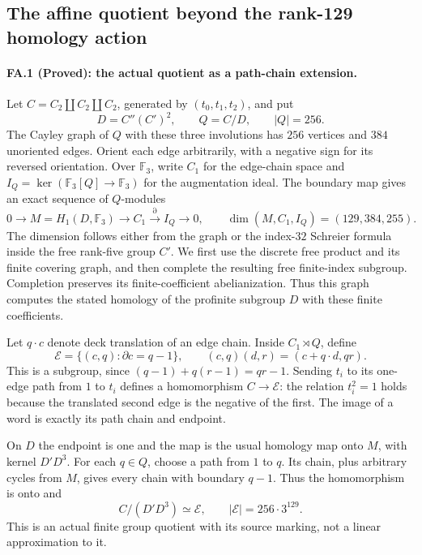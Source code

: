 \subsection*{The affine quotient beyond the rank-129 homology action}

\paragraph{FA.1 (Proved): the actual quotient as a path-chain extension.}
Let $C=C_2\amalg C_2\amalg C_2$, generated by
$(t_0,t_1,t_2)$, and put
\[
 D=C''(C')^2,\qquad Q=C/D,\qquad |Q|=256.
\]
The Cayley graph of $Q$ with these three involutions
has $256$ vertices and $384$ unoriented edges.
Orient each edge arbitrarily, with a negative sign
for its reversed orientation. Over $\mathbb F_3$,
write $C_1$ for the edge-chain space and
$I_Q=\ker(\mathbb F_3[Q]\to\mathbb F_3)$ for the
augmentation ideal. The boundary map gives an exact
sequence of $Q$-modules
\[
 0\longrightarrow M=H_1(D,\mathbb F_3)
 \longrightarrow C_1\stackrel{\partial}{\longrightarrow}
 I_Q\longrightarrow0,
 \qquad \dim(M,C_1,I_Q)=(129,384,255).
 \tag{FA.1a}
\]
The dimension follows either from the graph or the
index-$32$ Schreier formula inside the free rank-five
group $C'$. We first use the discrete free product and its
finite covering graph, and then complete the resulting
free finite-index subgroup. Completion preserves its
finite-coefficient abelianization. Thus this graph
computes the stated homology of the profinite subgroup
$D$ with these finite coefficients.

Let $q\cdot c$ denote deck translation of an edge chain.
Inside $C_1\rtimes Q$, define
\[
 \mathcal E=\{(c,q):\partial c=q-1\},\qquad
 (c,q)(d,r)=(c+q\cdot d,qr).
 \tag{FA.1b}
\]
This is a subgroup, since
$(q-1)+q(r-1)=qr-1$. Sending $t_i$ to its one-edge
path from $1$ to $t_i$ defines a homomorphism
$C\to\mathcal E$: the relation $t_i^2=1$ holds
because the translated second edge is the negative
of the first. The image of a word is exactly its
path chain and endpoint.

On $D$ the endpoint is one and the map is the usual
homology map onto $M$, with kernel $D'D^3$. For each
$q\in Q$, choose a path from $1$ to $q$. Its chain,
plus arbitrary cycles from $M$, gives every chain
with boundary $q-1$. Thus the homomorphism is onto
and
\[
       \boxed{\ C/(D'D^3)\simeq\mathcal E,\qquad
                    |\mathcal E|=256\cdot3^{129}.\ }
 \tag{FA.1c}
\]
This is an actual finite group quotient with its
source marking, not a linear approximation to it.

